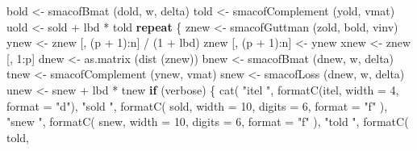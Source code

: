 \documentclass[
  12pt,
]{book}
\newenvironment{Shaded}{\begin{snugshade}}{\end{snugshade}}
\newcommand{\AttributeTok}[1]{\textcolor[rgb]{0.77,0.63,0.00}{#1}}
\newcommand{\ControlFlowTok}[1]{\textcolor[rgb]{0.13,0.29,0.53}{\textbf{#1}}}
\newcommand{\DecValTok}[1]{\textcolor[rgb]{0.00,0.00,0.81}{#1}}
\newcommand{\FunctionTok}[1]{\textcolor[rgb]{0.00,0.00,0.00}{#1}}
\newcommand{\NormalTok}[1]{#1}
\newcommand{\OtherTok}[1]{\textcolor[rgb]{0.56,0.35,0.01}{#1}}
\newcommand{\SpecialCharTok}[1]{\textcolor[rgb]{0.00,0.00,0.00}{#1}}
\newcommand{\StringTok}[1]{\textcolor[rgb]{0.31,0.60,0.02}{#1}}
\theoremstyle{definition}
\theoremstyle{definition}
\theoremstyle{definition}
\theoremstyle{definition}
\theoremstyle{remark}
\begin{document}
\begin{Shaded}
\begin{Highlighting}[]
\NormalTok{    bold }\OtherTok{\textless{}{-}} \FunctionTok{smacofBmat}\NormalTok{ (dold, w, delta)}
\NormalTok{    told }\OtherTok{\textless{}{-}} \FunctionTok{smacofComplement}\NormalTok{ (yold, vmat)}
\NormalTok{    uold }\OtherTok{\textless{}{-}}\NormalTok{ sold }\SpecialCharTok{+}\NormalTok{ lbd }\SpecialCharTok{*}\NormalTok{ told}
    \ControlFlowTok{repeat}\NormalTok{ \{}
\NormalTok{      znew }\OtherTok{\textless{}{-}} \FunctionTok{smacofGuttman}\NormalTok{ (zold, bold, vinv)}
\NormalTok{      ynew }\OtherTok{\textless{}{-}}\NormalTok{ znew [, (p }\SpecialCharTok{+} \DecValTok{1}\NormalTok{)}\SpecialCharTok{:}\NormalTok{n] }\SpecialCharTok{/}\NormalTok{ (}\DecValTok{1} \SpecialCharTok{+}\NormalTok{ lbd)}
\NormalTok{      znew [, (p }\SpecialCharTok{+} \DecValTok{1}\NormalTok{)}\SpecialCharTok{:}\NormalTok{n] }\OtherTok{\textless{}{-}}\NormalTok{ ynew}
\NormalTok{      xnew }\OtherTok{\textless{}{-}}\NormalTok{ znew [, }\DecValTok{1}\SpecialCharTok{:}\NormalTok{p]}
\NormalTok{      dnew }\OtherTok{\textless{}{-}} \FunctionTok{as.matrix}\NormalTok{ (}\FunctionTok{dist}\NormalTok{ (znew))}
\NormalTok{      bnew }\OtherTok{\textless{}{-}} \FunctionTok{smacofBmat}\NormalTok{ (dnew, w, delta)}
\NormalTok{      tnew }\OtherTok{\textless{}{-}} \FunctionTok{smacofComplement}\NormalTok{ (ynew, vmat)}
\NormalTok{      snew }\OtherTok{\textless{}{-}} \FunctionTok{smacofLoss}\NormalTok{ (dnew, w, delta)}
\NormalTok{      unew }\OtherTok{\textless{}{-}}\NormalTok{ snew }\SpecialCharTok{+}\NormalTok{ lbd }\SpecialCharTok{*}\NormalTok{ tnew}
      \ControlFlowTok{if}\NormalTok{ (verbose) \{}
        \FunctionTok{cat}\NormalTok{(}
          \StringTok{"itel "}\NormalTok{,}
          \FunctionTok{formatC}\NormalTok{(itel, }\AttributeTok{width =} \DecValTok{4}\NormalTok{, }\AttributeTok{format =} \StringTok{"d"}\NormalTok{),}
          \StringTok{"sold "}\NormalTok{,}
          \FunctionTok{formatC}\NormalTok{(}
\NormalTok{            sold,}
            \AttributeTok{width =} \DecValTok{10}\NormalTok{,}
            \AttributeTok{digits =} \DecValTok{6}\NormalTok{,}
            \AttributeTok{format =} \StringTok{"f"}
\NormalTok{          ),}
          \StringTok{"snew "}\NormalTok{,}
          \FunctionTok{formatC}\NormalTok{(}
\NormalTok{            snew,}
            \AttributeTok{width =} \DecValTok{10}\NormalTok{,}
            \AttributeTok{digits =} \DecValTok{6}\NormalTok{,}
            \AttributeTok{format =} \StringTok{"f"}
\NormalTok{          ),}
          \StringTok{"told "}\NormalTok{,}
          \FunctionTok{formatC}\NormalTok{(}
\NormalTok{            told,}

\end{Highlighting}
\end{Shaded}
\end{document}
